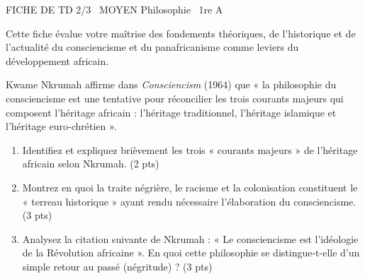 \documentclass[11pt]{article}
\begin{document}
\begin{tcolorbox}[enhanced,colback=popink,colframe=popink,arc=10pt,boxrule=0pt,left=12pt,right=12pt,top=9pt,bottom=9pt]
{\color{white}\popxbold\small FICHE DE TD 2/3 \textbullet\ MOYEN \hfill Philosophie \textbullet\ 1re A\par}
\end{tcolorbox}
\vspace{4pt}
Cette fiche évalue votre maîtrise des fondements théoriques, de l'historique et de l'actualité du consciencisme et du panafricanisme comme leviers du développement africain.

\begin{exercice}
Kwame Nkrumah affirme dans \textit{Consciencism} (1964) que « la philosophie du consciencisme est une tentative pour réconcilier les trois courants majeurs qui composent l'héritage africain : l'héritage traditionnel, l'héritage islamique et l'héritage euro-chrétien ».
\begin{enumerate}
    \item Identifiez et expliquez brièvement les trois « courants majeurs » de l'héritage africain selon Nkrumah. (2 pts)
    \item Montrez en quoi la traite négrière, le racisme et la colonisation constituent le « terreau historique » ayant rendu nécessaire l'élaboration du consciencisme. (3 pts)
    \item Analysez la citation suivante de Nkrumah : « Le consciencisme est l'idéologie de la Révolution africaine ». En quoi cette philosophie se distingue-t-elle d'un simple retour au passé (négritude) ? (3 pts)
\end{enumerate}
\end{exercice}
\end{document}
